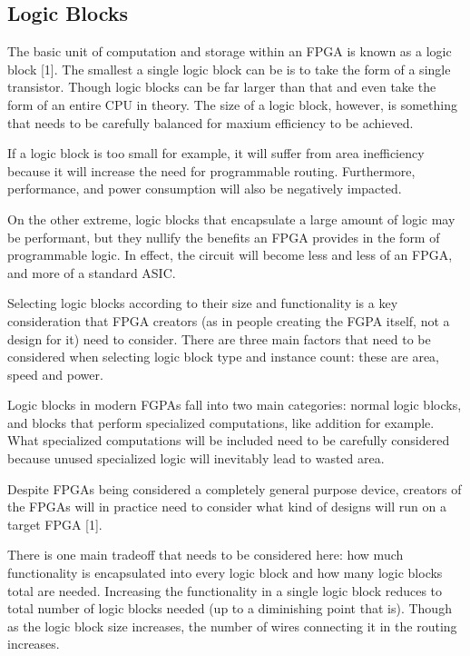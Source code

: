 \documentclass{article}
\begin{document}
    \subsection{Logic Blocks}

    The basic unit of computation and storage within an FPGA is known as a logic block [1].
    The smallest a single logic block can be is to take the form of a single transistor.
    Though logic blocks can be far larger than that and even take the form of an entire
    CPU in theory. The size of a logic block, however, is something that needs to be carefully
    balanced for maxium efficiency to be achieved.

    If a logic block is too small for example, it will suffer from area inefficiency because
    it will increase the need for programmable routing. Furthermore, performance, and
    power consumption will also be negatively impacted.

    On the other extreme, logic blocks that encapsulate a large amount of logic may
    be performant, but they nullify the benefits an FPGA provides in the form of programmable
    logic. In effect, the circuit will become less and less of an FPGA, and more of
    a standard ASIC.

    Selecting logic blocks according to their size and functionality is a key consideration
    that FPGA creators (as in people creating the FGPA itself, not a design for it) need
    to consider. There are three main factors that need to be considered when selecting logic
    block type and instance count: these are area, speed and power.

    Logic blocks in modern FGPAs fall into two main categories: normal logic blocks,
    and blocks that perform specialized computations, like addition for example.
    What specialized computations will be included need to be carefully considered
    because unused specialized logic will inevitably lead to wasted area.

    Despite FPGAs being considered a completely general purpose device,
    creators of the FPGAs will in practice need to consider what kind of designs
    will run on a target FPGA [1].

    There is one main tradeoff that needs to be considered here:
    how much functionality is encapsulated into every logic block and how many
    logic blocks total are needed.
    Increasing the functionality in a single logic block reduces to total
    number of logic blocks needed (up to a diminishing point that is).
    Though as the logic block size increases, the number of wires connecting
    it in the routing increases.
\end{document}
